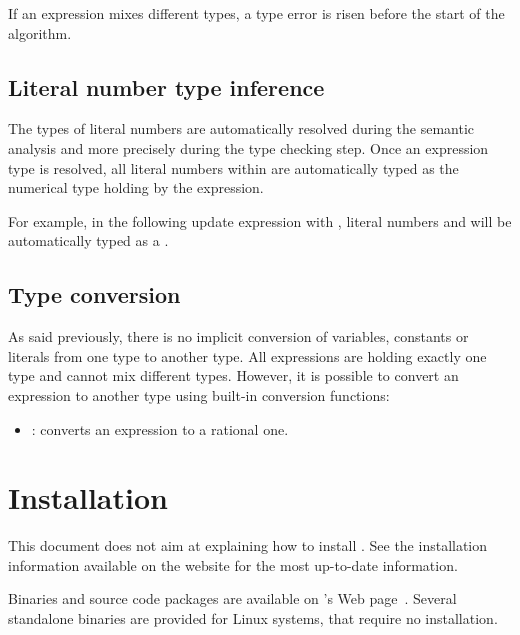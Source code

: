 If an expression mixes different types, a type error is risen before the start of the algorithm.


\subsection{Literal number type inference}

The types of literal numbers are automatically resolved during the semantic analysis and more precisely during the type checking step.
Once an expression type is resolved, all literal numbers within are automatically typed as the numerical type holding by the expression.

For example, in the following update expression  with , literal numbers  and  will be automatically typed as a .

\subsection{Type conversion}

As said previously, there is no implicit conversion of variables, constants or literals from one type to another type. All expressions are holding exactly one type and cannot mix different types. However, it is possible to convert an expression to another type using built-in conversion functions:

\begin{itemize}
	\item {}: converts an  expression to a rational one.
\end{itemize}



\section{Installation}

This document does not aim at explaining how to install \imitator{}.
See the installation information available on the website for the most up-to-date information.

Binaries and source code packages are available on \imitator{}'s Web page~\cite{imitator}.
Several standalone binaries are provided for Linux systems, that require no installation.








